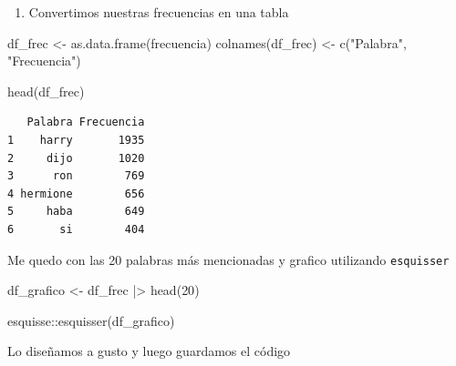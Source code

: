 \documentclass[
  letterpaper,
  DIV=11,
  numbers=noendperiod]{scrreprt}
\newenvironment{Shaded}{\begin{snugshade}}{\end{snugshade}}
\newcommand{\DecValTok}[1]{\textcolor[rgb]{0.68,0.00,0.00}{#1}}
\newcommand{\FunctionTok}[1]{\textcolor[rgb]{0.28,0.35,0.67}{#1}}
\newcommand{\NormalTok}[1]{\textcolor[rgb]{0.00,0.23,0.31}{#1}}
\newcommand{\OtherTok}[1]{\textcolor[rgb]{0.00,0.23,0.31}{#1}}
\newcommand{\SpecialCharTok}[1]{\textcolor[rgb]{0.37,0.37,0.37}{#1}}
\newcommand{\StringTok}[1]{\textcolor[rgb]{0.13,0.47,0.30}{#1}}
\providecommand{\tightlist}{%
  \setlength{\itemsep}{0pt}\setlength{\parskip}{0pt}}
\begin{document}
\begin{enumerate}
\def\labelenumi{\arabic{enumi})}
\tightlist
\item
  Convertimos nuestras frecuencias en una tabla
\end{enumerate}

\begin{Shaded}
\begin{Highlighting}[]
\NormalTok{df\_frec }\OtherTok{\textless{}{-}} \FunctionTok{as.data.frame}\NormalTok{(frecuencia)}
\FunctionTok{colnames}\NormalTok{(df\_frec) }\OtherTok{\textless{}{-}} \FunctionTok{c}\NormalTok{(}\StringTok{"Palabra"}\NormalTok{, }\StringTok{"Frecuencia"}\NormalTok{)}


\FunctionTok{head}\NormalTok{(df\_frec)}
\end{Highlighting}
\end{Shaded}

\begin{verbatim}
   Palabra Frecuencia
1    harry       1935
2     dijo       1020
3      ron        769
4 hermione        656
5     haba        649
6       si        404
\end{verbatim}

Me quedo con las 20 palabras más mencionadas y grafico utilizando
\texttt{esquisser}

\begin{Shaded}
\begin{Highlighting}[]
\NormalTok{df\_grafico }\OtherTok{\textless{}{-}}\NormalTok{ df\_frec }\SpecialCharTok{|\textgreater{}} 
  \FunctionTok{head}\NormalTok{(}\DecValTok{20}\NormalTok{)}
\end{Highlighting}
\end{Shaded}

\begin{Shaded}
\begin{Highlighting}[]
\NormalTok{esquisse}\SpecialCharTok{::}\FunctionTok{esquisser}\NormalTok{(df\_grafico)}
\end{Highlighting}
\end{Shaded}

Lo diseñamos a gusto y luego guardamos el código
\end{document}
